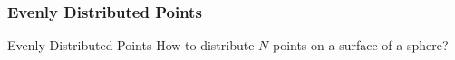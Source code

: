 \documentclass{beamer}
\begin{document}
\subsubsection{Evenly Distributed Points}
\begin{frame}{Evenly Distributed Points}
    \centering
    How to distribute $N$ points on a surface of a sphere?\\ ~\\ ~\\
    \begin{columns}
        
    \end{columns}
    \begin{columns}
        \begin{column}{0.4\textwidth}
            \begin{itemize}
            \end{itemize}
        \end{column}
        \begin{column}{0.2\textwidth}
        \end{column}
        \begin{column}{0.4\textwidth}
            \begin{itemize}
            \end{itemize}
        \end{column}
    \end{columns}
\end{frame}
\end{document}
